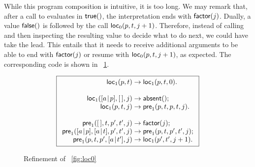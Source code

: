 While this program composition is intuitive, it is too long. We may
remark that, after a call to 
evaluates in \(\textsf{true}()\), the interpretation ends with
\(\textsf{factor}(j)\). Dually, a value \(\textsf{false}()\) is followed by
the call
\(\textsf{loc}_0(p,t,j+1)\). Therefore,
instead of calling  and then inspecting the resulting value
to decide what to do next, we could have  take the
lead. This entails that it needs to receive additional arguments to be
able to end with \(\textsf{factor}(j)\) or resume with
\(\textsf{loc}_0(p,t,j+1)\), as expected. The corresponding code is shown
in \fig~\ref{fig:loc1}.
\begin{figure}[t]
\begin{equation*}
\boxed{%
\begin{array}{r@{\;}l@{\;}l}
\fun{loc}_1(p,t)   & \rightarrow & \fun{loc}_1(p,t,0).\\
\\
\fun{loc}_1(\cons{a}{p},\el,j) & \rightarrow & \fun{absent}();\\
\fun{loc}_1(p,t,j) & \rightarrow & \fun{pre}_1(p,t,p,t,j).\\
\\
\fun{pre}_1(\el,t,p',t',j) & \rightarrow & \fun{factor}(j);\\
\fun{pre}_1(\cons{a}{p},\cons{a}{t},p',t',j)
                   & \rightarrow & \fun{pre}_1(p,t,p',t',j);\\
\fun{pre}_1(p,t,p',\cons{a}{t'},j) & \rightarrow & \fun{loc}_1(p',t',j+1).
\end{array}}
\end{equation*}
\caption{Refinement of \fig~\vref{fig:loc0}}
\label{fig:loc1}
\end{figure}

